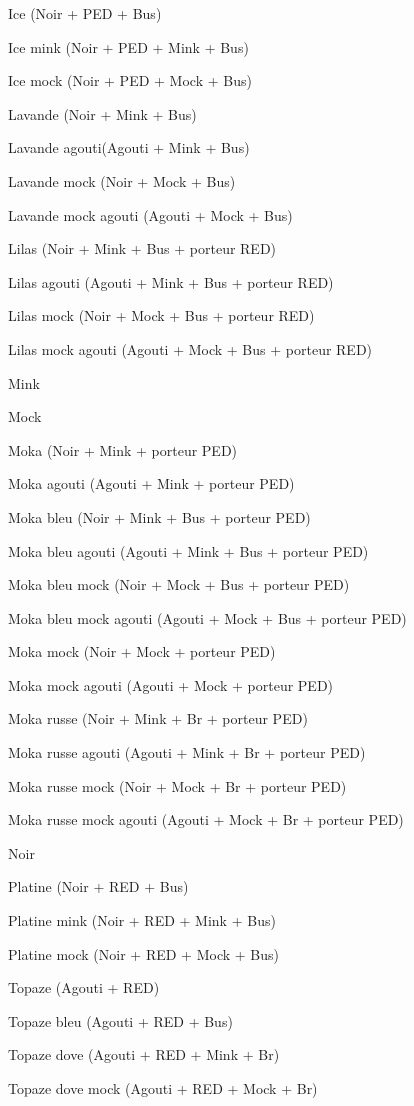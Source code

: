 \documentclass[a4paper,10pt]{article}
\begin{document}
Ice (Noir + PED + Bus)
 
Ice mink (Noir + PED + Mink + Bus)
 
Ice mock (Noir + PED + Mock + Bus)
 
Lavande (Noir + Mink + Bus)
 
Lavande agouti(Agouti + Mink + Bus)
 
Lavande mock (Noir + Mock + Bus)
 
Lavande mock agouti (Agouti + Mock + Bus)
 
Lilas (Noir + Mink + Bus + porteur RED)
 
Lilas agouti (Agouti + Mink + Bus +   porteur RED)
 
Lilas mock (Noir + Mock + Bus + porteur RED)

Lilas mock agouti (Agouti + Mock + Bus + porteur RED)
 
Mink
 
Mock
 
Moka (Noir + Mink + porteur PED)
 
Moka agouti (Agouti + Mink + porteur   PED)
 
Moka bleu (Noir + Mink + Bus + porteur   PED)
 
Moka bleu agouti (Agouti + Mink + Bus +   porteur PED)
 
Moka bleu mock (Noir + Mock + Bus + porteur PED)
 
Moka bleu mock agouti (Agouti + Mock +   Bus + porteur PED)
 
Moka mock (Noir + Mock + porteur PED)
 
Moka mock agouti (Agouti + Mock +   porteur PED)
 
Moka russe (Noir + Mink + Br + porteur  PED)
 
Moka russe agouti (Agouti + Mink + Br +  porteur PED)
 
Moka russe mock (Noir + Mock + Br + porteur PED)
 
Moka russe mock agouti (Agouti + Mock +  Br + porteur PED)
 
Noir
 
Platine (Noir + RED + Bus)
 
Platine mink (Noir + RED + Mink + Bus)
 
Platine mock (Noir + RED + Mock + Bus)
 
Topaze (Agouti + RED)
 
Topaze bleu (Agouti + RED + Bus)
 
Topaze dove (Agouti + RED + Mink + Br)
 
Topaze dove mock (Agouti + RED + Mock + Br)
 
\end{document}
